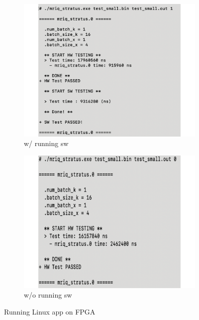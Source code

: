 \begin{figure}[t]
\centering
\begin{subfigure}{.5\columnwidth}
\centering
\includegraphics[width=\columnwidth]{figures/linux-run-sw}
\caption{w/ running sw}
\end{subfigure}%
\begin{subfigure}{.5\columnwidth}
\centering
\includegraphics[width=\columnwidth]{figures/linux-app-wo-run-sw}
\caption{w/o running sw}
\end{subfigure}
\caption{Running Linux app on FPGA}
\label{fig-linux-app}
\end{figure}
